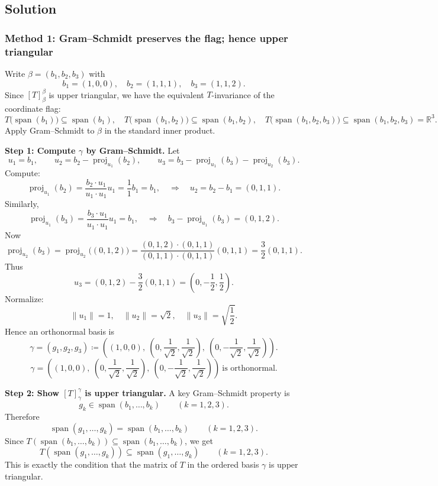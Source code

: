 \documentclass[12pt]{article}
\newcommand{\df}{\coloneqq}
\newcommand{\R}{\mathbb{R}}
\DeclareMathOperator{\Span}{span}
\DeclareMathOperator{\proj}{proj}
\begin{document}
\subsection{Solution}

\subsubsection{Method 1: Gram--Schmidt preserves the flag; hence upper triangular}
Write $\beta=(b_1,b_2,b_3)$ with
\[
b_1=(1,0,0),\quad b_2=(1,1,1),\quad b_3=(1,1,2).
\]
Since $[T]_{\beta}^{\beta}$ is upper triangular, we have the equivalent $T$-invariance of the coordinate flag:
\[
T\bigl(\Span(b_1)\bigr)\subseteq \Span(b_1),\quad
T\bigl(\Span(b_1,b_2)\bigr)\subseteq \Span(b_1,b_2),\quad
T\bigl(\Span(b_1,b_2,b_3)\bigr)\subseteq \Span(b_1,b_2,b_3)=\R^3.
\]
Apply Gram--Schmidt to $\beta$ in the standard inner product.

\medskip
\noindent\textbf{Step 1: Compute $\gamma$ by Gram--Schmidt.}
Let
\[
u_1=b_1,\qquad
u_2=b_2-\proj_{u_1}(b_2),\qquad
u_3=b_3-\proj_{u_1}(b_3)-\proj_{u_2}(b_3).
\]
Compute:
\[
\proj_{u_1}(b_2)=\frac{b_2\cdot u_1}{u_1\cdot u_1}u_1=\frac{1}{1}b_1=b_1,
\quad\Rightarrow\quad u_2=b_2-b_1=(0,1,1).
\]
Similarly,
\[
\proj_{u_1}(b_3)=\frac{b_3\cdot u_1}{u_1\cdot u_1}u_1=b_1,
\quad\Rightarrow\quad b_3-\proj_{u_1}(b_3)=(0,1,2).
\]
Now
\[
\proj_{u_2}(b_3)=\proj_{u_2}\bigl((0,1,2)\bigr)
=\frac{(0,1,2)\cdot (0,1,1)}{(0,1,1)\cdot(0,1,1)}(0,1,1)
=\frac{3}{2}(0,1,1).
\]
Thus
\[
u_3=(0,1,2)-\frac{3}{2}(0,1,1)=\left(0,-\frac12,\frac12\right).
\]
Normalize:
\[
\|u_1\|=1,\quad \|u_2\|=\sqrt2,\quad \|u_3\|=\sqrt{\frac12}.
\]
Hence an orthonormal basis is
\[
\gamma=(g_1,g_2,g_3)\df
\left(
(1,0,0),\ \left(0,\frac{1}{\sqrt2},\frac{1}{\sqrt2}\right),\ \left(0,-\frac{1}{\sqrt2},\frac{1}{\sqrt2}\right)
\right).
\]
\[
\boxed{\,
\gamma=\left(
(1,0,0),\ \left(0,\frac{1}{\sqrt2},\frac{1}{\sqrt2}\right),\ \left(0,-\frac{1}{\sqrt2},\frac{1}{\sqrt2}\right)
\right)\ \text{is orthonormal.}
\,}
\]

\medskip
\noindent\textbf{Step 2: Show $[T]_\gamma^\gamma$ is upper triangular.}
A key Gram--Schmidt property is
\[
g_k\in \Span(b_1,\dots,b_k)\qquad (k=1,2,3).
\]
Therefore
\[
\Span(g_1,\dots,g_k)=\Span(b_1,\dots,b_k)\qquad (k=1,2,3).
\]
Since $T(\Span(b_1,\dots,b_k))\subseteq \Span(b_1,\dots,b_k)$, we get
\[
T(\Span(g_1,\dots,g_k))\subseteq \Span(g_1,\dots,g_k)\qquad (k=1,2,3).
\]
This is exactly the condition that the matrix of $T$ in the ordered basis $\gamma$ is upper triangular.
\end{document}
